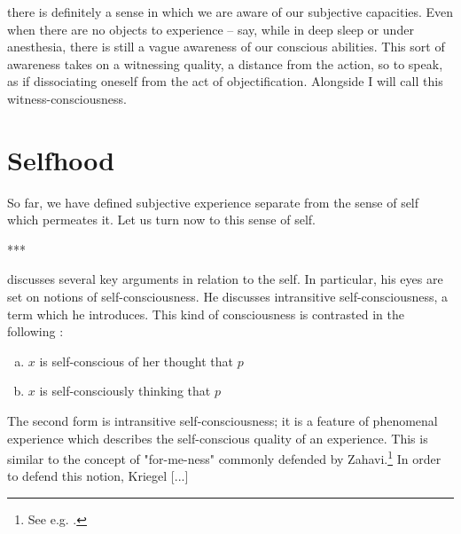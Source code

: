 \documentclass[leqno]{article}
\begin{document}
	there is definitely a sense in which we are aware of our subjective capacities.
	Even when there are no objects to experience – say, while in deep sleep or
	under anesthesia, there is still a vague awareness of our conscious abilities.
	This sort of awareness takes on a witnessing quality, a distance from the action,
	so to speak, as if dissociating oneself from the act of objectification.
	Alongside \textcites{albahari2006}{albahari2009} I will call this witness-consciousness.

	\section{Selfhood}

	So far, we have defined subjective experience separate from the sense of self
	which permeates it. Let us turn now to this sense of self.

	***

	\textcite{kriegel2003} discusses several key arguments in relation to the self.
	In particular, his eyes are set on notions of self-consciousness. He discusses
	intransitive self-consciousness, a term which he introduces. This kind of
	consciousness is contrasted in the following \autocite[p. 103]{kriegel2003}:

	\begin{enumerate}[(a)]
		\item $x$ is self-conscious of her thought that $p$

		\item $x$ is self-consciously thinking that $p$
	\end{enumerate}

	The second form is intransitive self-consciousness; it is a feature of phenomenal
	experience which describes the self-conscious quality of an experience. This
	is similar to the concept of "for-me-ness" commonly defended by Zahavi.\footnote{See
	e.g. \autocites{zahavi2015, zahavi2020}.} In order to defend this notion, Kriegel
	[...]
\end{document}

